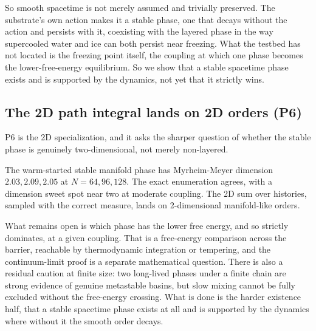 So smooth spacetime is not merely assumed and trivially preserved. The substrate's own action makes it a stable phase, one that decays without the action and persists with it, coexisting with the layered phase in the way supercooled water and ice can both persist near freezing. What the testbed has not located is the freezing point itself, the coupling at which one phase becomes the lower-free-energy equilibrium. So we show that a stable spacetime phase exists and is supported by the dynamics, not yet that it strictly wins.

\subsection{The 2D path integral lands on 2D orders (P6)}

P6 is the 2D specialization, and it asks the sharper question of whether the stable phase is genuinely two-dimensional, not merely non-layered.

\begin{result}
The warm-started stable manifold phase has Myrheim-Meyer dimension $2.03, 2.09, 2.05$ at $N = 64, 96, 128$. The exact enumeration agrees, with a dimension sweet spot near two at moderate coupling. The 2D sum over histories, sampled with the correct measure, lands on 2-dimensional manifold-like orders.
\end{result}

What remains open is which phase has the lower free energy, and so strictly dominates, at a given coupling. That is a free-energy comparison across the barrier, reachable by thermodynamic integration or tempering, and the continuum-limit proof is a separate mathematical question. There is also a residual caution at finite size: two long-lived phases under a finite chain are strong evidence of genuine metastable basins, but slow mixing cannot be fully excluded without the free-energy crossing. What is done is the harder existence half, that a stable spacetime phase exists at all and is supported by the dynamics where without it the smooth order decays.
